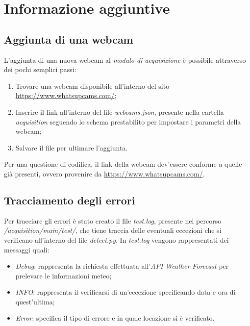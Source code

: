 \chapter{Informazione aggiuntive}\label{InformazioniAggiuntive}

\section{Aggiunta di una webcam}\label{InformazioniAggiuntiveAggiuntaDiUnaWebcam}
L'aggiunta di una nuova webcam al \textit{modulo di acquisizione} è possibile attraverso dei pochi semplici passi:
\begin{enumerate}
	\item Trovare una webcam disponibile all'interno del sito \url{https://www.whatsupcams.com/};
	\item Inserire il link all'interno del file \textit{webcams.json}, presente nella cartella \textit{acquisition} seguendo lo schema prestabilito per impostare i parametri della webcam;
	\item Salvare il file per ultimare l'aggiunta.
\end{enumerate}
Per una questione di codifica, il link della webcam dev'essere conforme a quelle già presenti, ovvero provenire da \url{https://www.whatsupcams.com/}.

\section{Tracciamento degli errori}\label{InformazioniAggiuntiveTracciamentoDegliErrori}
Per tracciare gli errori è stato creato il file \textit{test.log}, presente nel percorso \textit{/acquisition/main/test/}, che tiene traccia delle eventuali eccezioni che si verificano all'interno del file \textit{detect.py}.
In \textit{test.log} vengono rappresentati dei messaggi quali:
\begin{itemize}
  \item \textit{Debug}: rappresenta la richiesta effettuata all'\textit{API Weather Forecast} per prelevare le informazioni meteo;
  \item \textit{INFO}: rappresenta il verificarsi di un'eccezione specificando data e ora di quest'ultima;
  \item \textit{Error}: specifica il tipo di errore e in quale locazione si è verificato.
\end{itemize}
